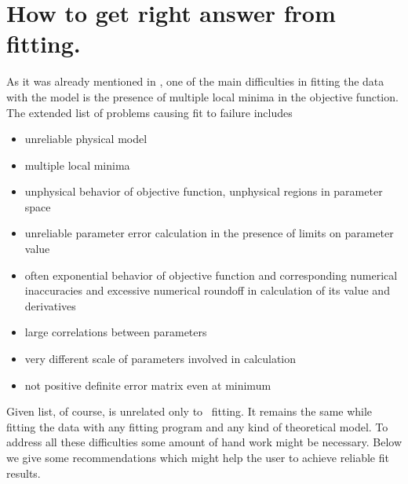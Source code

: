 \section {How to get right answer from fitting.} 

As it was already mentioned in , 
one of the main difficulties in fitting the data with the model 
is the presence of multiple
local minima in the objective function. The extended list of problems causing fit to failure includes
\begin{itemize}
\item unreliable physical model
\item multiple local minima
\item unphysical behavior of objective function, unphysical regions in parameter space
\item unreliable parameter error calculation in the presence of limits on parameter value
\item often exponential behavior of objective function and corresponding numerical inaccuracies and excessive numerical roundoff in calculation of its value and derivatives
\item large correlations between parameters
\item very different scale of parameters involved in calculation
\item not positive definite error matrix even at minimum
\end{itemize}


Given list, of course, is unrelated only to \BornAgain\ fitting. It remains the same
while fitting the data with any fitting program and any kind of theoretical model.
To address all these difficulties some amount of hand work might be necessary. Below we give some recommendations which might help the user to achieve reliable fit results.

